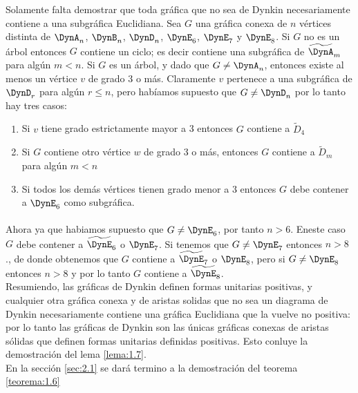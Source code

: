 Solamente falta demostrar que toda gráfica que no sea de Dynkin necesariamente contiene a una subgráfica Euclidiana. Sea $G$ una gráfica conexa de $n$ vértices distinta de $\DynA_{n}$, $\DynB_{n}$, $\DynD_{n}$, $\DynE_{6}$, $\DynE_{7}$ y $\DynE_{8}$. Si $G$ no es un árbol entonces $G$ contiene un ciclo; es decir contiene una subgráfica de $\widetilde{\DynA}_{m}$ para algún $m < n$. Si $G$ es un árbol, y dado que $G \neq \DynA_{n}$, entonces existe al menos un vértice $v$ de grado 3 o más. Claramente $v$ pertenece a una subgráfica de $\DynD_{r}$ para algún $r \leq n$, pero habíamos supuesto que $G \neq \DynD_{n}$ por lo tanto hay tres casos:

\begin{enumerate}
    \item Si $v$ tiene grado estrictamente mayor a 3 entonces $G$ contiene a $\widetilde{D}_{4}$
    \item Si $G$ contiene otro vértice $w$ de grado 3 o más, entonces $G$ contiene a $\widetilde{D}_{m}$ para algún $m < n$
    \item Si todos los demás vértices tienen grado menor a 3 entonces $G$ debe contener a $\DynE_{6}$ como subgráfica.
\end{enumerate}

\paragraph{}
 Ahora ya que habiamos supuesto que $G \neq \DynE_{6}$, por tanto $n > 6$. Eneste caso $G$ debe contener a $\widetilde{\DynE}_{6}$ o $\DynE_{7}$. Si tenemos que $G \neq \DynE_{7}$ entonces $n > 8$., de donde obtenemos que $G$ contiene a $\widetilde{\DynE}_{7}$ o $\DynE_{8}$, pero si $G \neq \DynE_{8}$ entonces $n > 8$ y por lo tanto $G$ contiene a $\widetilde{\DynE}_{8}$.\\
Resumiendo, las gráficas de Dynkin definen formas unitarias positivas, y cualquier otra gráfica conexa y de aristas solidas que no sea un diagrama de Dynkin necesariamente contiene una gráfica Euclidiana que la vuelve no positiva: por lo tanto las gráficas de Dynkin son las únicas gráficas conexas de aristas sólidas que definen formas unitarias definidas positivas. Esto conluye la demostración del lema \ref{lema:1.7}.\\
En la sección \ref{sec:2.1} se dará termino a la demostración del teorema \ref{teorema:1.6}
